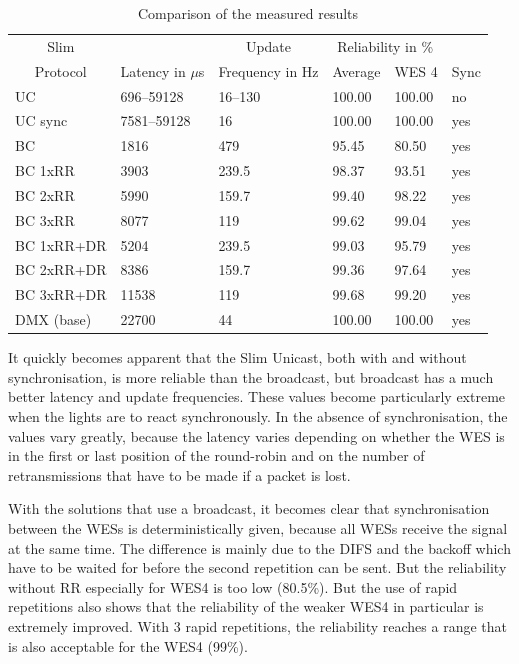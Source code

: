 \begin{table}[h]
	\centering
	\begin{tabular} { llllll }
	\toprule
	\multicolumn{1}{c}{Slim}
	& \multicolumn{1}{c}{}
	& \multicolumn{1}{c}{Update}
	& \multicolumn{2}{c}{Reliability in \%} 
	& \multicolumn{1}{c}{} \\

	\multicolumn{1}{c}{Protocol}
	& \multicolumn{1}{c}{Latency in $\mu$s}
	& \multicolumn{1}{c}{Frequency in Hz}
	& \multicolumn{1}{c}{Average}
	& \multicolumn{1}{c}{WES 4}
	& \multicolumn{1}{c}{Sync} \\

	\midrule
	UC        &  696–59128 & 16–130  & 100.00 & 100.00 & no \\
	UC sync   & 7581–59128 & 16      & 100.00 & 100.00 & yes \\
	BC        &  1816      & 479     & 95.45  & 80.50  & yes \\
	BC 1xRR   &  3903      & 239.5   & 98.37  & 93.51  & yes \\
	BC 2xRR   &  5990      & 159.7   & 99.40  & 98.22  & yes \\
	BC 3xRR   &  8077      & 119     & 99.62  & 99.04  & yes \\
	BC 1xRR+DR&  5204      & 239.5   & 99.03  & 95.79  & yes \\
	BC 2xRR+DR&  8386      & 159.7   & 99.36  & 97.64  & yes \\
	BC 3xRR+DR&  11538     & 119     & 99.68  & 99.20  & yes \\
	DMX (base)&  22700     & 44      & 100.00 & 100.00 & yes \\
	\bottomrule
	\end{tabular}
	\caption{Comparison of the measured results}
	\label{tab:results}
\end{table}

It quickly becomes apparent that the Slim Unicast, both with and without synchronisation, 
is more reliable than the broadcast, but broadcast has a much better latency and update frequencies.
These values become particularly extreme when the lights are to react synchronously.
In the absence of synchronisation, the values vary greatly, 
because the latency varies depending on whether the WES is in the first or last position of the round-robin
and on the number of retransmissions that have to be made if a packet is lost.

With the solutions that use a broadcast, 
it becomes clear that synchronisation between the WESs is deterministically given,
because all WESs receive the signal at the same time.
The difference is mainly due to the DIFS and the backoff 
which have to be waited for before the second repetition can be sent.
But the reliability without RR especially for WES4 is too low (80.5\%).
But the use of rapid repetitions also shows that the reliability of the weaker WES4 in particular is extremely improved.
With 3 rapid repetitions, the reliability reaches a range that is also acceptable for the WES4 (99\%).

